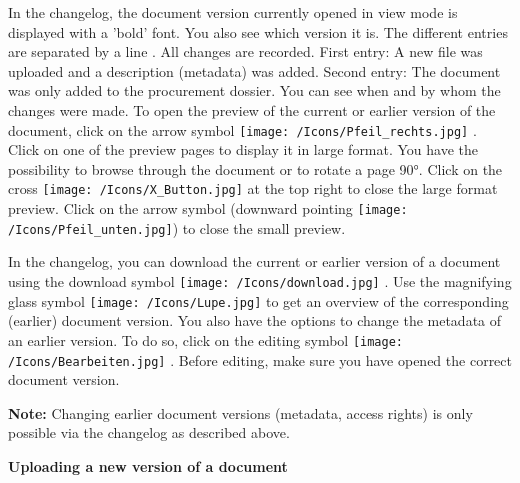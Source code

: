  In the changelog, the document version currently opened in view mode is displayed with a 'bold' font. You also see which version it is. The different entries are separated by a line . All changes are recorded. First entry: A new file was uploaded and a description (metadata) was added. Second entry: The document was only added to the procurement dossier. You can see when and by whom the changes were made. To open the preview of the current or earlier version of the document, click on the arrow symbol \texttt{[image: /Icons/Pfeil\_rechts.jpg]} . Click on one of the preview pages to display it in large format. You have the possibility to browse through the document or to rotate a page 90°. Click on the cross \texttt{[image: /Icons/X\_Button.jpg]} at the top right to close the large format preview. Click on the arrow symbol (downward pointing \texttt{[image: /Icons/Pfeil\_unten.jpg]}) to close the small preview.

In the changelog, you can download the current or earlier version of a document using the download symbol \texttt{[image: /Icons/download.jpg]} . Use the magnifying glass symbol \texttt{[image: /Icons/Lupe.jpg]}  to get an overview of the corresponding (earlier) document version. You also have the options to change the metadata of an earlier version. To do so, click on the editing symbol \texttt{[image: /Icons/Bearbeiten.jpg]} . Before editing, make sure you have opened the correct document version.

\vspace{\baselineskip}

\textbf{Note:} Changing earlier document versions (metadata, access rights) is only possible via the changelog as described above.

\pagebreak

\textbf{Uploading a new version of a document}

\vspace{\baselineskip}

